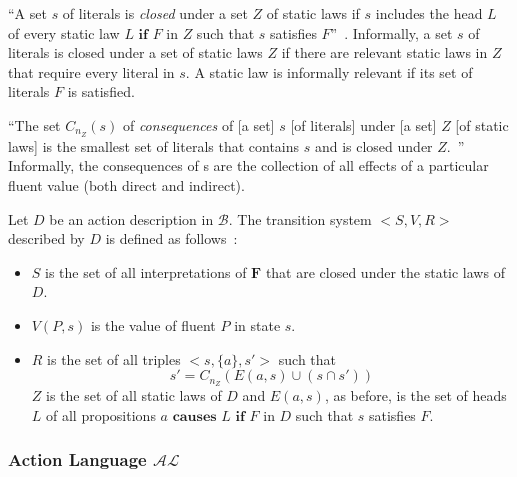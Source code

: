 \begin{definition}
    ``A set $s$ of literals is \textit{closed} under a set $Z$ of static laws if $s$ includes the head $L$ of every static law $L \textbf{ if } F$ in $Z$ such that $s$ satisfies $F$''~\citep{gelfond_action_1998}.
    Informally, a set $s$ of literals is closed under a set of static laws $Z$ if there are relevant static laws in $Z$ that require every literal in $s$.
    A static law is informally relevant if its set of literals $F$ is satisfied.
\end{definition}

\begin{definition}
    ``The set $C_{n_Z}\left(s\right)$ of \textit{consequences} of [a set] $s$ [of literals] under [a set] $Z$ [of static laws] is the smallest set of literals that contains $s$ and is closed under $Z$.~\citep{gelfond_action_1998}''
    Informally, the consequences of s are the collection of all effects of a particular fluent value (both direct and indirect).
\end{definition}

\begin{definition}
    Let $D$ be an action description in $\mathcal{B}$.
    The transition system $< S, V, R >$ described by $D$ is defined as follows~\citep{gelfond_action_1998}:

    \begin{itemize}
        \item $S$ is the set of all interpretations of $\boldsymbol{F}$ that are closed under the static laws of $D$.
        \item $ V(P, s) $ is the value of fluent $P$ in state $s$.
        \item $R$ is the set of all triples $<s, \{a\}, s'>$ such that
            \begin{equation}
                s'=C_{n_Z}\left(E\left(a,s\right)\cup\left(s \cap s'\right)\right)
            \end{equation}
            $ Z $ is the set of all static laws of $D$ and $E(a, s)$, as before, is the set of heads $L$ of all propositions $a \textbf{ causes } L \textbf{ if } F$ in $D$ such that $s$ satisfies $F$.
    \end{itemize}
\end{definition}

\subsubsection{Action Language $\mathcal{AL}$}
\label{subsubsec:action_language_al}

